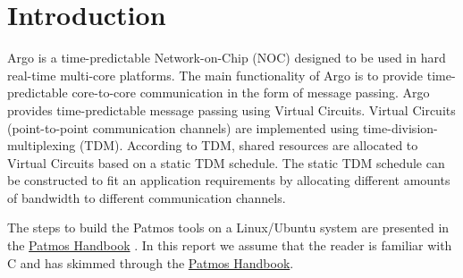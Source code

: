 \documentclass[a4paper,fontsize=10pt,twoside,DIV15,BCOR12mm,headinclude=true,footinclude=false,pagesize,bibtotoc]{scrbook}
\begin{document}
\mainmatter



\chapter{Introduction}


Argo is a time-predictable Network-on-Chip (NOC) designed to be used in hard real-time multi-core platforms.
The main functionality of Argo is to provide time-predictable core-to-core communication in the form of message passing.
Argo provides time-predictable message passing using Virtual Circuits. Virtual Circuits (point-to-point communication channels)
are implemented using time-division-multiplexing (TDM). According to TDM,
shared resources are allocated to Virtual Circuits based on a static TDM schedule.
The static TDM schedule can be constructed to fit an application requirements by allocating
different amounts of bandwidth to different communication channels.





The steps to build the Patmos tools on a Linux/Ubuntu
system are presented in the \href{http://patmos.compute.dtu.dk/patmos_handbook.pdf}{Patmos Handbook} 
\cite{patmos-handbook}.
In this report we assume that the reader is familiar with C and has skimmed
through the \href{http://patmos.compute.dtu.dk/patmos_handbook.pdf}{Patmos Handbook}.
\end{document}
